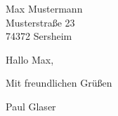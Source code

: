 \documentclass[
fontsize=12pt,
%
parskip=full,
%
paper=A4,
%
fromalign=right,
%
fromphone=true,
%
%
fromemail=true,
%
%
%
version=last,
]{scrlttr2}
\begin{document}
	\begin{letter}{
			Max Mustermann\\
			Musterstraße 23\\
			74372 Sersheim
		}
		
		\opening{Hallo Max,}
		
		
		\lipsum[1]
		
		
		\closing{Mit freundlichen Grüßen}
		Paul Glaser
		
		
		
		
	\end{letter}
	
	
	
\end{document}
